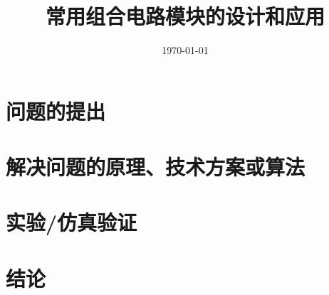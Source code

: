 \documentclass{../source/Experiment}
\title{常用组合电路模块的设计和应用}
\date{\today}
\begin{document}
    \makecover
    

    \section{问题的提出}

    
    \section{解决问题的原理、技术方案或算法}


    \section{实验/仿真验证}


    \section{结论}




    
    
    
\end{document}
